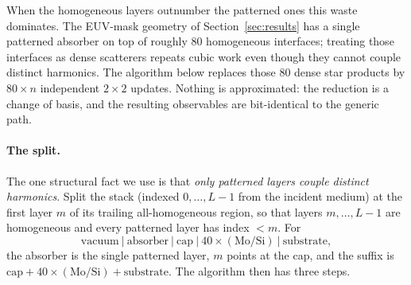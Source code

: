 \documentclass[11pt]{article}
\theoremstyle{remark}
\begin{document}
When the homogeneous layers outnumber the patterned ones this waste dominates.
The EUV-mask geometry of Section~\ref{sec:results} has a single patterned
absorber on top of roughly $80$ homogeneous interfaces; treating those
interfaces as dense scatterers repeats cubic work even though they cannot
couple distinct harmonics.  The algorithm below replaces those $80$ dense star
products by $80\times n$ independent $2\times2$ updates.  Nothing is
approximated: the reduction is a change of basis, and the resulting observables
are bit-identical to the generic path.

\paragraph{The split.}
The one structural fact we use is that \emph{only patterned layers couple
distinct harmonics}.  Split the stack (indexed $0,\dots,L-1$ from the incident
medium) at the first layer $m$ of its trailing all-homogeneous region, so that
layers $m,\dots,L-1$ are homogeneous and every patterned layer has index
$<m$.  For
\begin{equation*}
\text{vacuum}\ |\ \text{absorber}\ |\ \text{cap}\ |\
40\times(\text{Mo}/\text{Si})\ |\ \text{substrate},
\end{equation*}
the absorber is the single patterned layer, $m$ points at the cap, and the
suffix is $\text{cap} + 40\times(\text{Mo}/\text{Si}) + \text{substrate}$.
The algorithm then has three steps.
\end{document}
